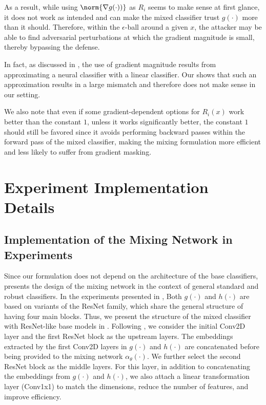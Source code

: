 \documentclass[11pt, letterpaper]{article}
\theoremstyle{plain}
\theoremstyle{definition}
\begin{document}
As a result, while using $\norm{\nabla g(\cdot))}$ as $R_i$ seems to make sense at first glance, it does not work as intended and can make the mixed classifier trust $g (\cdot)$ more than it should. Therefore, within the $\epsilon$-ball around a given $x$, the attacker may be able to find adversarial perturbations at which the gradient magnitude is small, thereby bypassing the defense.

In fact, as discussed in \citep{Anderson21b}, the use of gradient magnitude results from approximating a neural classifier with a linear classifier. Our  shows that such an approximation results in a large mismatch and therefore does not make sense in our setting.
	
We also note that even if some gradient-dependent options for $R_i (x)$ work better than the constant $1$, unless it works significantly better, the constant $1$ should still be favored since it avoids performing backward passes within the forward pass of the mixed classifier, making the mixing formulation more efficient and less likely to suffer from gradient masking.



\section{Experiment Implementation Details}

\subsection{Implementation of the Mixing Network in Experiments} \label{sec:mixing_arch_rn}

Since our formulation does not depend on the architecture of the base classifiers,  presents the design of the mixing network in the context of general standard and robust classifiers. In the experiments presented in , Both $g (\cdot)$ and $h (\cdot)$ are based on variants of the ResNet family, which share the general structure of having four main blocks. Thus, we present the structure of the mixed classifier with ResNet-like base models in . Following \citep{Metzen17}, we consider the initial Conv2D layer and the first ResNet block as the upstream layers. The embeddings extracted by the first Conv2D layers in $g (\cdot)$ and $h (\cdot)$ are concatenated before being provided to the mixing network $\alpha_\theta (\cdot)$. We further select the second ResNet block as the middle layers. For this layer, in addition to concatenating the embeddings from $g (\cdot)$ and $h (\cdot)$, we also attach a linear transformation layer (Conv1x1) to match the dimensions, reduce the number of features, and improve efficiency.
\end{document}
